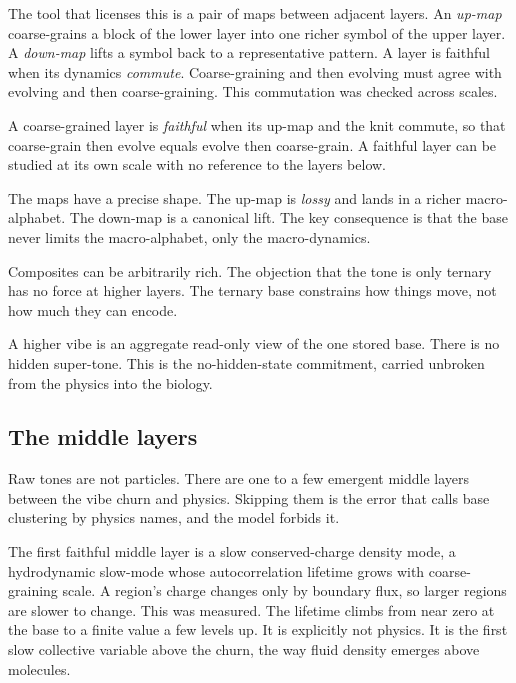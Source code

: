 The tool that licenses this is a pair of maps between adjacent layers. An \emph{up-map} coarse-grains a block of the lower layer into one richer symbol of the upper layer. A \emph{down-map} lifts a symbol back to a representative pattern. A layer is faithful when its dynamics \emph{commute}. Coarse-graining and then evolving must agree with evolving and then coarse-graining. This commutation was checked across scales.

\begin{definition}
A coarse-grained layer is \emph{faithful} when its up-map and the knit commute, so that coarse-grain then evolve equals evolve then coarse-grain. A faithful layer can be studied at its own scale with no reference to the layers below.
\end{definition}

The maps have a precise shape. The up-map is \emph{lossy} and lands in a richer macro-alphabet. The down-map is a canonical lift. The key consequence is that the base never limits the macro-alphabet, only the macro-dynamics.

\begin{principle}
Composites can be arbitrarily rich. The objection that the tone is only ternary has no force at higher layers. The ternary base constrains how things move, not how much they can encode.
\end{principle}

A higher vibe is an aggregate read-only view of the one stored base. There is no hidden super-tone. This is the no-hidden-state commitment, carried unbroken from the physics into the biology.

\subsection{The middle layers}

Raw tones are not particles. There are one to a few emergent middle layers between the vibe churn and physics. Skipping them is the error that calls base clustering by physics names, and the model forbids it.

The first faithful middle layer is a slow conserved-charge density mode, a hydrodynamic slow-mode whose autocorrelation lifetime grows with coarse-graining scale. A region's charge changes only by boundary flux, so larger regions are slower to change. This was measured. The lifetime climbs from near zero at the base to a finite value a few levels up. It is explicitly not physics. It is the first slow collective variable above the churn, the way fluid density emerges above molecules.

